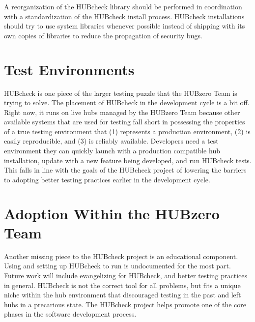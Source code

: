 A reorganization of the HUBcheck library should be performed in coordination
with a standardization of the HUBcheck install process. HUBcheck installations
should try to use system libraries whenever possible instead of shipping with
its own copies of libraries to reduce the propagation of security bugs.

\section{Test Environments}
\label{sec:future_testenv}

HUBcheck is one piece of the larger testing puzzle that the HUBzero Team is
trying to solve. The placement of HUBcheck in the development cycle is a bit
off. Right now, it runs on live hubs managed by the HUBzero Team because other
available systems that are used for testing fall short in possessing the
properties of a true testing environment that (1) represents a production
environment, (2) is easily reproducible, and (3) is reliably available.
Developers need a test environment they can quickly launch with a production
compatible hub installation, update with a new feature being developed, and run
HUBcheck tests. This falls in line with the goals of the HUBcheck project of
lowering the barriers to adopting better testing practices earlier in the
development cycle.

\section{Adoption Within the HUBzero Team}
\label{sec:future_adoption}

Another missing piece to the HUBcheck project is an educational component.
Using and setting up HUBcheck to run is undocumented for the most part. Future
work will include evangelizing for HUBcheck, and better testing practices in
general. HUBcheck is not the correct tool for all problems, but fits a unique
niche within the hub environment that discouraged testing in the past and left
hubs in a precarious state. The HUBcheck project helps promote one of the core
phases in the software development process.
